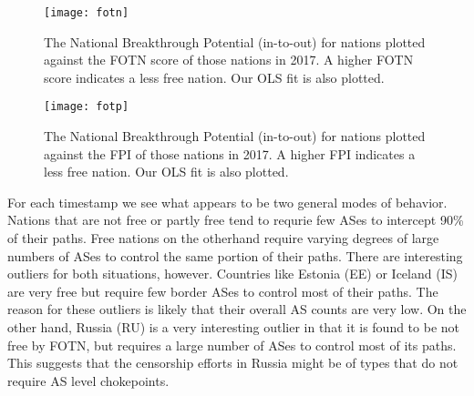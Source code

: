 \begin{figure}
	\centering
	\texttt{[image: fotn]}
	\caption{The National Breakthrough Potential (in-to-out) for nations plotted against the FOTN score
	of those nations in 2017. A higher FOTN score indicates a less free nation. Our OLS fit is also plotted.}\label{fig:fotn}
\end{figure}

\begin{figure}
	\centering
	\texttt{[image: fotp]}
	\caption{The National Breakthrough Potential (in-to-out) for nations plotted against the FPI
	of those nations in 2017. A higher FPI indicates a less free nation. Our OLS fit is also plotted.}\label{fig:fotp}
\end{figure}

For each timestamp we see what appears to be two general modes of behavior.
Nations that are not free or partly free tend to requrie few ASes to intercept
90\% of their paths. Free nations on the otherhand require varying degrees of
large numbers of ASes to control the same portion of their paths. There are
interesting outliers for both situations, however. Countries like Estonia (EE)
or Iceland (IS) are very free but require few border ASes to control most of
their paths. The reason for these outliers is likely that their overall AS
counts are very low. On the other hand, Russia (RU) is a very interesting
outlier in that it is found to be not free by FOTN, but requires a large number
of ASes to control most of its paths. This suggests that the censorship efforts
in Russia might be of types that do not require AS level chokepoints.
